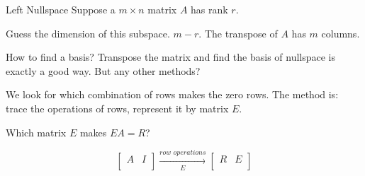 \documentclass{beamer}
\begin{document}
\begin{frame}{Left Nullspace}
Suppose a $m \times n$ matrix $A$ has rank $r$.

\vspace{3pt}
Guess the dimension of this subspace. $m-r$. The transpose of $A$ has $m$ columns.

\vspace{3pt}
How to find a basis? Transpose the matrix and find the basis of nullspace is exactly a good way. But any other methods?

\vspace{3pt}
We look for which combination of rows makes the zero rows. The method is: trace the operations of rows, represent it by matrix $E$.

\vspace{3pt}
Which matrix $E$ makes $EA=R$?

\begin{equation*}
    \left[ \begin{matrix}
        A&		I\\
    \end{matrix} \right] \xrightarrow[E]{row\,\,operations}\left[ \begin{matrix}
        R&		E\\
    \end{matrix} \right]
\end{equation*}
\end{frame}
\end{document}
